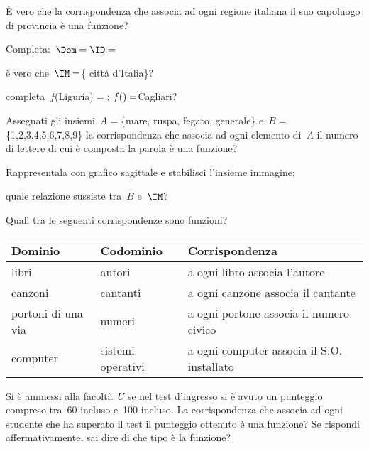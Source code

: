 \begin{esercizio}
 \label{ese:D.2}
È vero che la corrispondenza che associa ad ogni regione italiana il suo 
capoluogo di provincia è una funzione?

\begin{enumeratea}
\item Completa:~$\Dom = \ID = \dotfill$
\item è vero che~$\IM = $\{ città d'Italia\}?
\item completa~$f$(Liguria)$=$\dotfill; $f(\dotfill) = $Cagliari?
\end{enumeratea}
\end{esercizio}

\begin{esercizio}
 \label{ese:D.3}
Assegnati gli insiemi~$A=$\{mare, ruspa, fegato, generale\} 
e~$B=$\{1,2,3,4,5,6,7,8,9\} la corrispondenza
che associa ad ogni elemento di~$A$ il numero di lettere di cui è
composta la parola è una funzione?

\begin{enumeratea}
\item Rappresentala con grafico sagittale e stabilisci l'insieme immagine;
\item quale relazione sussiste tra~$B$ e~$\IM$?
\end{enumeratea}
\end{esercizio}

\begin{esercizio}
 \label{ese:D.4}
Quali tra le seguenti corrispondenze sono funzioni?
\begin{center}
 \begin{tabular}{*3{l}}
 \toprule
  Dominio & Codominio & Corrispondenza\\
\midrule
libri & autori & a ogni libro associa l'autore\\
canzoni & cantanti & a ogni canzone associa il cantante\\
portoni di una via & numeri & a ogni portone associa il numero civico\\
computer & sistemi operativi & a ogni computer associa il S.O. installato\\
\bottomrule
 \end{tabular}
\end{center}
\end{esercizio}

\begin{esercizio}
 \label{ese:D.5}
Si è ammessi alla facoltà~$U$ se nel test
d'ingresso si è avuto un punteggio compreso tra~60
incluso e~100 incluso. La corrispondenza che associa ad ogni studente
che ha superato il test il punteggio ottenuto è una funzione? Se rispondi
affermativamente, sai dire di che tipo è la funzione?
\end{esercizio}


